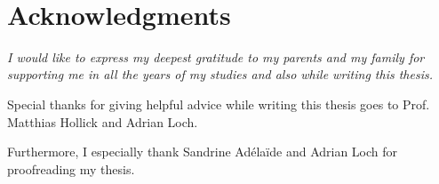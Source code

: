 





\bigskip
\ \\[5cm]
\begingroup
\let\clearpage\relax
\let\cleardoublepage\relax
\let\cleardoublepage\relax
\centering
\begin{minipage}[h]{7cm}
\chapter*{Acknowledgments}
\centering
{\slshape 
I would like to express my deepest gratitude to my parents and my family for supporting me in all the years of my studies and also while writing this thesis.

\bigskip

Special thanks for giving helpful advice while writing this thesis goes to Prof. Matthias Hollick and Adrian Loch.

\bigskip

Furthermore, I especially thank Sandrine Adéla\"ide and Adrian Loch for proofreading my thesis.
}
\end{minipage}

\endgroup


